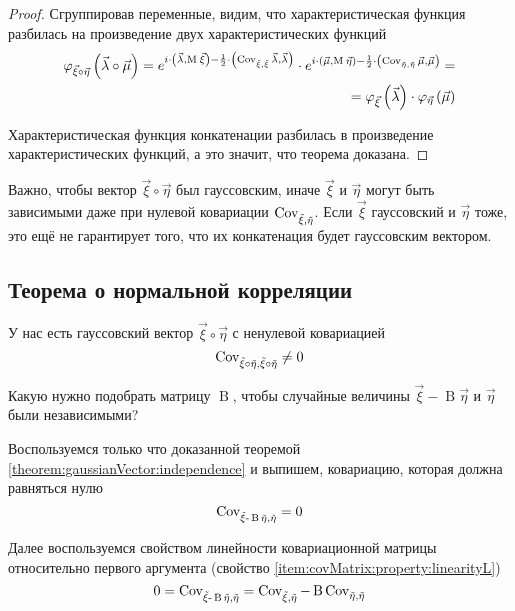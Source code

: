 \begin{proof}
    Сгруппировав переменные, видим, что характеристическая функция разбилась
    на произведение двух характеристических функций
    \begin{align*}
        \varphi_{\vec{\xi} \circ \vec{\eta}}\left(
            \vec{\lambda} \circ \vec{\mu} \right)
        = e^{
            i \cdot \left( \vec{\lambda}, \operatorname{M}_{} \vec{\xi} \right)
                - \frac{1}{2} \cdot
                    \left( \operatorname{Cov^{}_{\vec{\xi}, \vec{\xi}}} \vec{\lambda}, \vec{\lambda} \right)
                }
            \cdot e^{
                i \cdot \left( \vec{\mu}, \operatorname{M}_{} \vec{\eta} \right)
                    - \frac{1}{2} \cdot
                        \left( \operatorname{Cov^{}_{\vec{\eta}, \vec{\eta}}} \vec{\mu}, \vec{\mu} \right)
                    } = \\
        = \varphi_{\vec{\xi}}\left( \vec{\lambda} \right)
            \cdot \varphi_{\vec{\eta}}\left( \vec{\mu} \right)
    \end{align*}

    Характеристическая функция конкатенации разбилась в произведение
    характеристических функций, а это значит, что теорема доказана.
\end{proof}

\begin{remark}
    Важно, чтобы вектор $\vec{\xi} \circ \vec{\eta}$ был гауссовским, иначе
    $\vec{\xi}$ и $\vec{\eta}$ могут быть зависимыми даже при нулевой ковариации
    $\operatorname{Cov^{}_{\vec{\xi}, \vec{\eta}}}$.
    Если $\vec{\xi}$ гауссовский и $\vec{\eta}$ тоже, это ещё не гарантирует
    того, что их конкатенация будет гауссовским вектором.
\end{remark}

\subsection{Теорема о нормальной корреляции}

У нас есть гауссовский вектор $\vec{\xi} \circ \vec{\eta}$ с ненулевой
ковариацией
$$\operatorname{Cov^{}_{\vec{\xi} \circ \vec{\eta}, \vec{\xi} \circ \vec{\eta}}} \neq 0$$

Какую нужно подобрать матрицу $\operatorname{B}$, чтобы случайные величины
$\vec{\xi} - \operatorname{B} \vec{\eta}$ и $\vec{\eta}$ были независимыми?

Воспользуемся только что доказанной теоремой
\ref{theorem:gaussianVector:independence} и выпишем, ковариацию, которая должна
равняться нулю
$$\operatorname{Cov^{}_{\vec{\xi} - \operatorname{B} \vec{\eta}, \vec{\eta}}} = 0$$

Далее воспользуемся свойством линейности ковариационной матрицы относительно
первого аргумента (свойство \ref{item:covMatrix:property:linearityL})
$$0
    = \operatorname{Cov^{}_{\vec{\xi} - \operatorname{B} \vec{\eta}, \vec{\eta}}}
    = \operatorname{Cov^{}_{\vec{\xi}, \vec{\eta}}}
        - \operatorname{B} \operatorname{Cov^{}_{\vec{\eta}, \vec{\eta}}}$$

